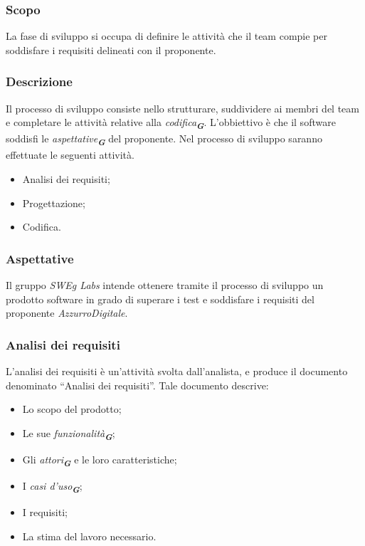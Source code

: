 \subsubsection{Scopo}
La fase di sviluppo si occupa di definire le attività che il team compie per soddisfare i requisiti delineati con il proponente.

\subsubsection{Descrizione}
Il processo di sviluppo consiste nello strutturare, suddividere ai membri del team e completare le attività relative alla \emph{codifica}\textsubscript{\textit{\textbf{G}}}. L’obbiettivo è che il software soddisfi le \emph{aspettative}\textsubscript{\textit{\textbf{G}}} del proponente.
Nel processo di sviluppo saranno effettuate le seguenti attività.
\begin{itemize}
    \item Analisi dei requisiti;
    \item Progettazione;
    \item Codifica.
\end{itemize}

\subsubsection{Aspettative}
Il gruppo \emph{SWEg Labs} intende ottenere tramite il processo di sviluppo un prodotto software in grado di superare i test e soddisfare i requisiti del proponente \emph{AzzurroDigitale}.

\subsubsection{Analisi dei requisiti}
\label{sec:analisi_dei_requisiti}

L’analisi dei requisiti è un’attività svolta dall’analista, e produce il documento denominato “Analisi dei requisiti”. 
Tale documento descrive:
\begin{itemize}
    \item Lo scopo del prodotto;
    \item Le sue \emph{funzionalità}\textsubscript{\textit{\textbf{G}}};
    \item Gli \emph{attori}\textsubscript{\textit{\textbf{G}}} e le loro caratteristiche;
    \item I \emph{casi d'uso}\textsubscript{\textit{\textbf{G}}};
    \item I requisiti;
    \item La stima del lavoro necessario.
\end{itemize}

